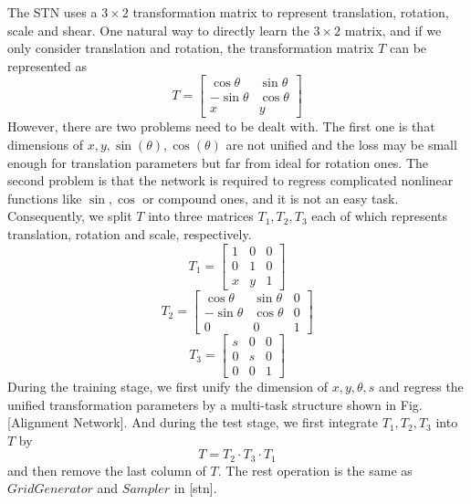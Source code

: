 \documentclass[10pt,conference,a4paper]{IEEEtran}
\begin{document}
	The STN uses a $3 \times 2$ transformation matrix to represent translation, rotation, scale and shear. One natural way to directly learn the $3 \times 2$ matrix, and if we only consider translation and rotation, the transformation matrix $T$ can be represented as 
	\begin{equation}
		T = 
		\begin{bmatrix}
		\cos\theta & \sin\theta\\ 
		-\sin\theta & \cos\theta\\
		x & y
		\end{bmatrix}
	\end{equation}
	However, there are two problems need to be dealt with. The first one is that dimensions of $x, y, \sin(\theta), \cos(\theta)$ are not unified and the loss may be small enough for translation parameters but far from ideal for rotation ones. The second problem is that the network is required to regress complicated nonlinear functions like $\sin, \cos$ or compound ones, and it is not an easy task. Consequently, we split $T$ into three matrices $T_1, T_2, T_3$ each of which represents translation, rotation and scale, respectively.
	\begin{equation}
		T_1 = 
		\begin{bmatrix}
		1 & 0 & 0\\
		0 & 1 & 0\\
		x & y & 1
		\end{bmatrix}
	\end{equation}
	\begin{equation}
		T_2 = 
		\begin{bmatrix}
		\cos\theta & \sin\theta & 0\\
		-\sin\theta & \cos\theta & 0\\
		0 & 0 & 1
		\end{bmatrix}
	\end{equation}
	\begin{equation}
	T_3 = 
	\begin{bmatrix}
	s & 0 & 0\\
	0 & s & 0\\
	0 & 0 & 1
	\end{bmatrix}
	\end{equation}
	During the training stage, we first unify the dimension of $x, y, \theta, s$ and regress the unified transformation parameters by a multi-task structure shown in Fig.[Alignment Network]. And during the test stage, we first integrate $T_1, T_2, T_3$ into $T$ by
	\begin{equation}
		T = T_2 \cdot T_3 \cdot T_1
	\end{equation}
	and then remove the last column of $T$. The rest operation is the same as $Grid Generator$ and $Sampler$ in [stn].
		
\end{document}
